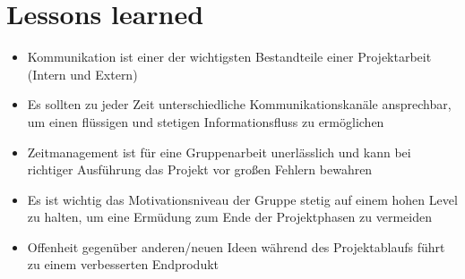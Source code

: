 \documentclass{scrartcl}
\begin{document}
\section{Lessons learned}
\begin{itemize}
	\item {Kommunikation ist einer der wichtigsten Bestandteile einer Projektarbeit (Intern und Extern) }
	\item {Es sollten zu jeder Zeit unterschiedliche Kommunikationskanäle ansprechbar, um einen flüssigen und stetigen Informationsfluss zu ermöglichen}
	\item {Zeitmanagement ist für eine Gruppenarbeit unerlässlich und kann bei richtiger Ausführung das Projekt vor großen Fehlern bewahren}
	\item {Es ist wichtig das Motivationsniveau der Gruppe stetig auf einem hohen Level zu halten, um eine Ermüdung zum Ende der Projektphasen zu vermeiden}
	\item {Offenheit gegenüber anderen/neuen Ideen während des Projektablaufs führt zu einem verbesserten Endprodukt}
\end{itemize}
\end{document}

